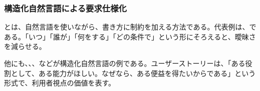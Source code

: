 \subsubsection{構造化自然言語による要求仕様化}

とは、自然言語を使いながら、書き方に制約を加える方法である。代表例は、である。「いつ」「誰が」「何をする」「どの条件で」という形にそろえると、曖昧さを減らせる。


他にも、、、などが構造化自然言語の例である。ユーザーストーリーは、「ある役割として、ある能力がほしい。なぜなら、ある便益を得たいからである」という形式で、利用者視点の価値を表す。
